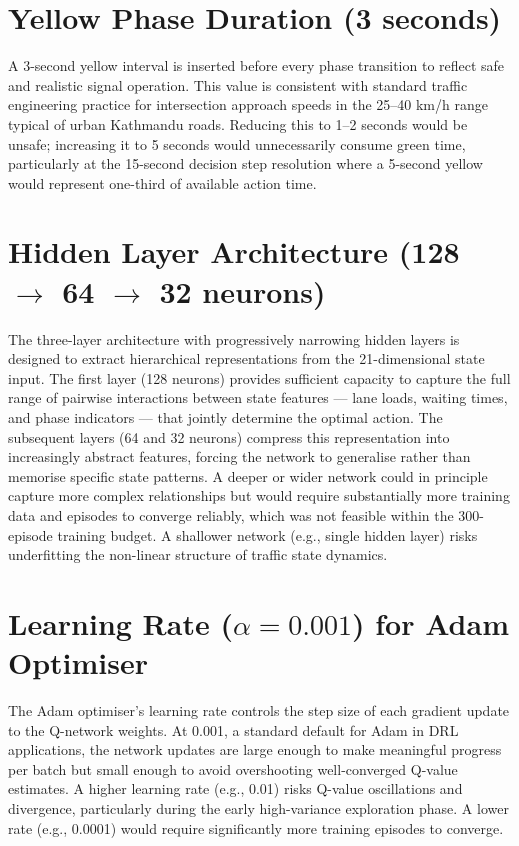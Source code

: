 \section{Yellow Phase Duration (3 seconds)}

A 3-second yellow interval is inserted before every phase transition to reflect safe and realistic signal operation. This value is consistent with standard traffic engineering practice for intersection approach speeds in the 25–40 km/h range typical of urban Kathmandu roads. Reducing this to 1–2 seconds would be unsafe; increasing it to 5 seconds would unnecessarily consume green time, particularly at the 15-second decision step resolution where a 5-second yellow would represent one-third of available action time.

\section{Hidden Layer Architecture (128 \( \rightarrow \) 64 \( \rightarrow \) 32 neurons)}

The three-layer architecture with progressively narrowing hidden layers is designed to extract hierarchical representations from the 21-dimensional state input. The first layer (128 neurons) provides sufficient capacity to capture the full range of pairwise interactions between state features — lane loads, waiting times, and phase indicators — that jointly determine the optimal action. The subsequent layers (64 and 32 neurons) compress this representation into increasingly abstract features, forcing the network to generalise rather than memorise specific state patterns. A deeper or wider network could in principle capture more complex relationships but would require substantially more training data and episodes to converge reliably, which was not feasible within the 300-episode training budget. A shallower network (e.g., single hidden layer) risks underfitting the non-linear structure of traffic state dynamics.

\section{Learning Rate (\( \alpha = 0.001 \)) for Adam Optimiser}

The Adam optimiser's learning rate controls the step size of each gradient update to the Q-network weights. At 0.001, a standard default for Adam in DRL applications, the network updates are large enough to make meaningful progress per batch but small enough to avoid overshooting well-converged Q-value estimates. A higher learning rate (e.g., 0.01) risks Q-value oscillations and divergence, particularly during the early high-variance exploration phase. A lower rate (e.g., 0.0001) would require significantly more training episodes to converge.

